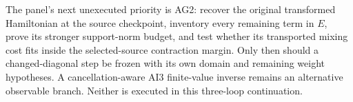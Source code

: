 The panel's next unexecuted priority is AG2: recover the original transformed Hamiltonian at the source checkpoint, inventory every remaining term in $E$, prove its stronger support-norm budget, and test whether its transported mixing cost fits inside the selected-source contraction margin. Only then should a changed-diagonal step be frozen with its own domain and remaining weight hypotheses. A cancellation-aware AI3 finite-value inverse remains an alternative observable branch. Neither is executed in this three-loop continuation.
